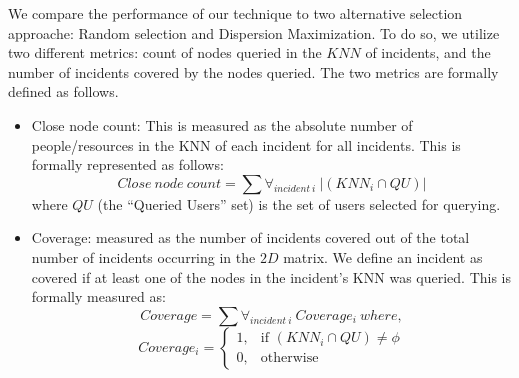 \documentclass{acm_proc_article-sp}
\begin{document}
We compare the performance of our technique to two alternative selection approache: Random selection and Dispersion Maximization. To do so, we utilize two different metrics: count of nodes queried in the $KNN$ of incidents, and the number of incidents covered by the nodes queried. The two metrics are formally defined as follows.
\begin{itemize}
\item Close node count: This is measured as the absolute number of people/resources in the KNN of each incident for all incidents. This is formally represented as follows:
\begin{equation}
Close\ node\ count = \sum \forall_{incident\ i}\ |(KNN_i \cap {QU})|
\end{equation}
where $QU$ (the ``Queried Users'' set) is the set of users selected for querying.
\item Coverage: measured as the number of incidents covered out of the total number of incidents occurring in the $2D$ matrix. We define an incident as covered if at least one of the nodes in the incident's KNN was queried. This is formally measured as:
\begin{equation}
Coverage = \sum \forall_{incident\ i}\ Coverage_i\  where,
\end{equation}
\[
  Coverage_i =
\begin{cases}
  1,& \text{if }(KNN_i \cap {QU}) \neq \phi\\
  0,              & \text{otherwise}
\end{cases}
\]
\end{itemize}
\end{document}
